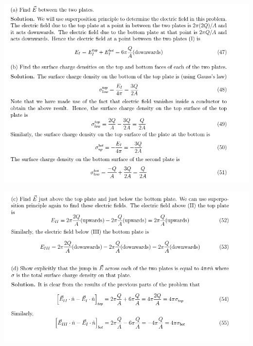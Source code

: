 \documentclass{esg8022pset}
\begin{document}
\begin{solution}
  \begin{center}\includegraphics[width=\textwidth]{ps07_sol_08_1}\end{center}
  \begin{center}\includegraphics[width=\textwidth]{ps07_sol_08_2}\end{center}
\end{solution}
\end{document}
